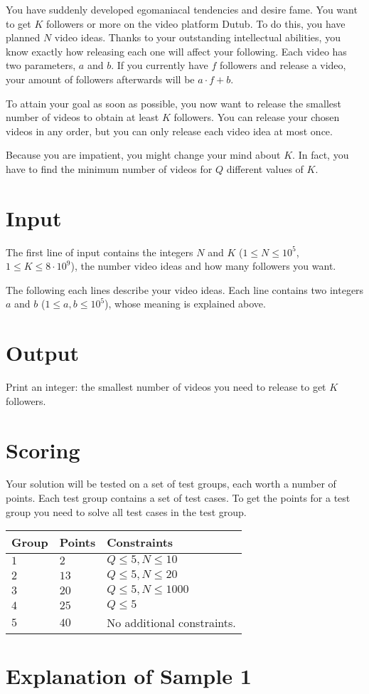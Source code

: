 
\noindent
You have suddenly developed egomaniacal tendencies and desire fame. You want to get $K$ followers or more on the video platform
Dutub. To do this, you have planned $N$ video ideas. Thanks to your outstanding intellectual abilities, you know exactly
how releasing each one will affect your following. Each video has two parameters, $a$ and $b$. If you currently have $f$ followers
and release a video, your amount of followers afterwards will be $a \cdot f + b$. 

To attain your goal as soon as possible, you now want to release the smallest number of videos to obtain at least $K$ followers.
You can release your chosen videos in any order, but you can only release each video idea at most once.

Because you are impatient, you might change your mind about $K$. In fact, you have to find the minimum number of videos
for $Q$ different values of $K$.

\section*{Input}
The first line of input contains the integers $N$ and $K$ ($1 \le N \le 10^5$, $1 \leq K \leq 8 \cdot 10^9$), the number video ideas
and how many followers you want.

The following each lines describe your video ideas. Each line contains two integers $a$ and $b$ ($1 \leq a, b \leq 10^5$),
whose meaning is explained above.

\section*{Output}
Print an integer: the smallest number of videos you need to release to get $K$ followers.

\section*{Scoring}
Your solution will be tested on a set of test groups, each worth a number of points. Each test group contains
a set of test cases. To get the points for a test group you need to solve all test cases in the test group.

\noindent
\begin{tabular}{| l | l | p{12cm} |}
  \hline
  \textbf{Group} & \textbf{Points} & \textbf{Constraints} \\ \hline
  $1$    & $2$        & $Q \leq 5, N \leq 10$ \\ \hline
  $2$    & $13$       & $Q \leq 5, N \leq 20$ \\ \hline
  $3$    & $20$       & $Q \leq 5, N \leq 1000$ \\ \hline
  $4$    & $25$       & $Q \leq 5$ \\ \hline
  $5$    & $40$       & No additional constraints. \\ \hline
\end{tabular}

\section*{Explanation of Sample 1}
